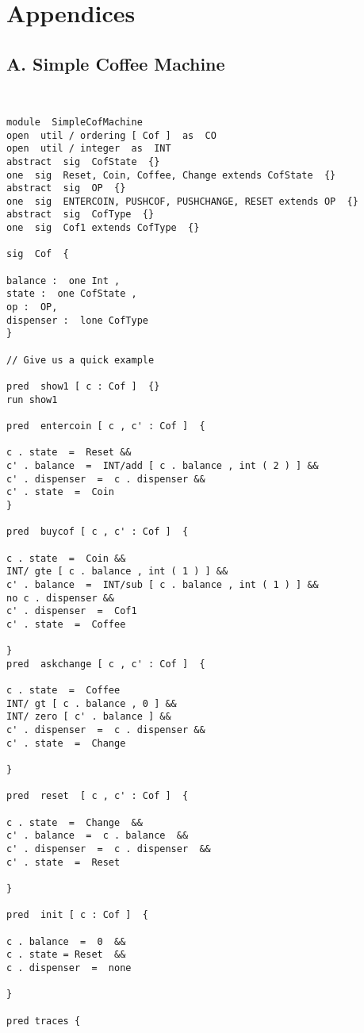 \documentclass[a4paper,12pt]{extarticle}
\begin{document}
\section{Appendices}
\label{Appendices}
\subsection{A. Simple Coffee Machine}


\begin{verbatim}


module  SimpleCofMachine
open  util / ordering [ Cof ]  as  CO
open  util / integer  as  INT
abstract  sig  CofState  {}
one  sig  Reset, Coin, Coffee, Change extends CofState  {}
abstract  sig  OP  {}
one  sig  ENTERCOIN, PUSHCOF, PUSHCHANGE, RESET extends OP  {}
abstract  sig  CofType  {}
one  sig  Cof1 extends CofType  {}

sig  Cof  {

balance :  one Int ,
state :  one CofState ,
op :  OP,
dispenser :  lone CofType
}

// Give us a quick example

pred  show1 [ c : Cof ]  {}
run show1

pred  entercoin [ c , c' : Cof ]  {

c . state  =  Reset &&
c' . balance  =  INT/add [ c . balance , int ( 2 ) ] &&
c' . dispenser  =  c . dispenser &&
c' . state  =  Coin
}

pred  buycof [ c , c' : Cof ]  {

c . state  =  Coin &&
INT/ gte [ c . balance , int ( 1 ) ] &&
c' . balance  =  INT/sub [ c . balance , int ( 1 ) ] &&
no c . dispenser &&
c' . dispenser  =  Cof1
c' . state  =  Coffee

}
pred  askchange [ c , c' : Cof ]  {

c . state  =  Coffee
INT/ gt [ c . balance , 0 ] &&
INT/ zero [ c' . balance ] &&
c' . dispenser  =  c . dispenser &&
c' . state  =  Change

}

pred  reset  [ c , c' : Cof ]  {

c . state  =  Change  &&
c' . balance  =  c . balance  &&
c' . dispenser  =  c . dispenser  &&
c' . state  =  Reset

}

pred  init [ c : Cof ]  {

c . balance  =  0  &&
c . state = Reset  &&
c . dispenser  =  none

}

pred traces {


\end{verbatim}
\end{document}
